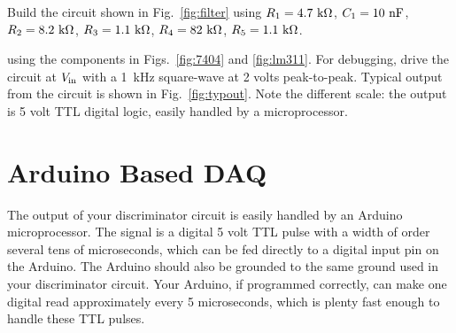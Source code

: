 \documentclass[12pt]{article}
\begin{document}
Build the circuit shown in Fig.~\ref{fig:filter} using $R_1=4.7~{\rm k\Omega}$, $C_1=10~{\rm nF}$,
$R_2=8.2~{\rm k\Omega}$, $R_3=1.1~{\rm k\Omega}$, $R_4=82~{\rm k\Omega}$, $R_5=1.1~{\rm k\Omega}$.

using the components in Figs.~\ref{fig:7404} and \ref{fig:lm311}.  For debugging, drive the circuit at $V_{\rm in}$ with a 1~kHz square-wave at 2 volts peak-to-peak.  Typical output from the circuit is shown in Fig.~\ref{fig:typout}.  Note the different scale:  the output is 5 volt TTL digital logic, easily handled by a microprocessor.

\section{Arduino Based DAQ}

The output of your discriminator circuit is easily handled by an Arduino microprocessor.  The signal is a digital 5 volt TTL pulse with a width of order several tens of microseconds, which can be fed directly to a digital input pin on the Arduino.  The Arduino should also be grounded to the same ground used in your discriminator circuit.  Your Arduino, if programmed correctly, can make one digital read approximately every 5 microseconds, which is plenty fast enough to handle these TTL pulses.
\end{document}
